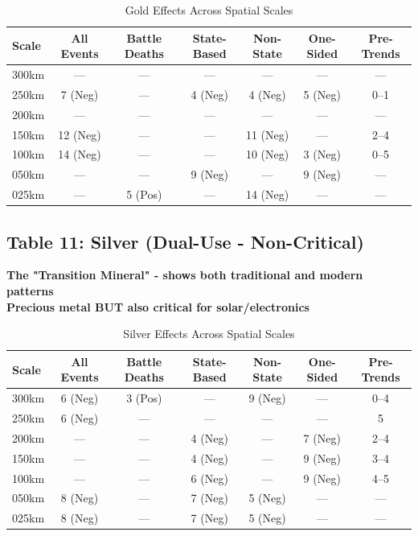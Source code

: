 \documentclass[11pt]{article}
\begin{document}
\begin{table}[H]
\centering
\caption{Gold Effects Across Spatial Scales}
\begin{tabular}{lcccccc}
\toprule
Scale & All Events & Battle Deaths & State-Based & Non-State & One-Sided & Pre-Trends \\
\midrule
300km & ---       & ---           & ---         & ---       & ---       & ---        \\
250km & 7 (Neg)   & ---           & 4 (Neg)     & 4 (Neg)   & 5 (Neg)   & 0--1       \\
200km & ---       & ---           & ---         & ---       & ---       & ---        \\
150km & 12 (Neg)  & ---           & ---         & 11 (Neg)  & ---       & 2--4       \\
100km & 14 (Neg)  & ---           & ---         & 10 (Neg)  & 3 (Neg)   & 0--5       \\
050km & ---       & ---           & 9 (Neg)     & ---       & 9 (Neg)   & ---        \\
025km & ---       & 5 (Pos)       & ---         & 14 (Neg)  & ---       & ---        \\
\bottomrule
\end{tabular}
\end{table}

\clearpage

\subsection{Table 11: Silver (Dual-Use - Non-Critical)}

\textbf{The "Transition Mineral" - shows both traditional and modern patterns}\\
\textbf{Precious metal BUT also critical for solar/electronics}

\begin{table}[H]
\centering
\caption{Silver Effects Across Spatial Scales}
\begin{tabular}{lcccccc}
\toprule
Scale & All Events & Battle Deaths & State-Based & Non-State & One-Sided & Pre-Trends \\
\midrule
300km & 6 (Neg)   & 3 (Pos)       & ---         & 9 (Neg)   & ---       & 0--4       \\
250km & 6 (Neg)   & ---           & ---         & ---       & ---       & 5          \\
200km & ---       & ---           & 4 (Neg)     & ---       & 7 (Neg)   & 2--4       \\
150km & ---       & ---           & 4 (Neg)     & ---       & 9 (Neg)   & 3--4       \\
100km & ---       & ---           & 6 (Neg)     & ---       & 9 (Neg)   & 4--5       \\
050km & 8 (Neg)   & ---           & 7 (Neg)     & 5 (Neg)   & ---       & ---        \\
025km & 8 (Neg)   & ---           & 7 (Neg)     & 5 (Neg)   & ---       & ---        \\
\bottomrule
\end{tabular}
\end{table}
\end{document}

